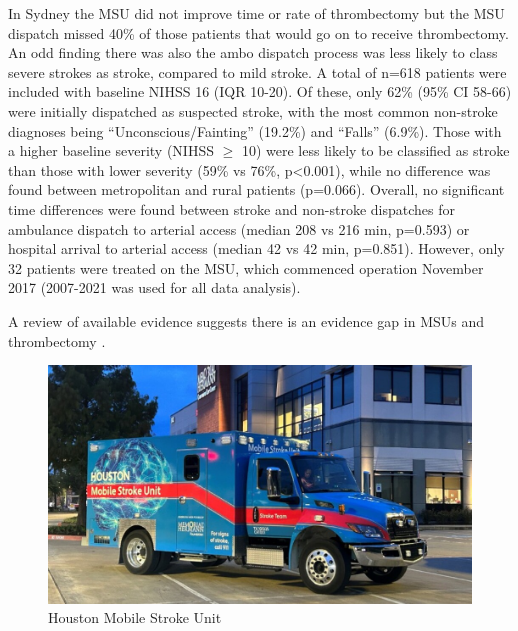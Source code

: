 In Sydney the MSU did not improve time or rate of thrombectomy \cite{haliem_abstract_2023} but the MSU dispatch missed 40\% of those patients that would go on to receive thrombectomy. An odd finding there was also the ambo dispatch process was less likely to class severe strokes as stroke, compared to mild stroke. A total of n=618 patients were included with baseline NIHSS 16 (IQR 10-20). Of these, only 62\% (95\% CI 58-66) were initially dispatched as suspected stroke, with the most common non-stroke diagnoses being “Unconscious/Fainting” (19.2\%) and “Falls” (6.9\%). Those with a higher baseline severity (NIHSS $\ge$ 10) were less likely to be classified as stroke than those with lower severity (59\% vs 76\%, p<0.001), while no difference was found between metropolitan and rural patients (p=0.066). Overall, no significant time differences were found between stroke and non-stroke dispatches for ambulance dispatch to arterial access (median 208 vs 216 min, p=0.593) or hospital arrival to arterial access (median 42 vs 42 min, p=0.851). However, only 32 patients were treated on the MSU, which commenced operation November 2017 (2007-2021 was used for all data analysis). 


A review of available evidence suggests there is an evidence gap in MSUs and thrombectomy \cite{navi_mobile_2022}.





\begin{figure}
    \centering
    \includegraphics[width=0.5\linewidth]{images_background/houston_msu.jpeg}
    \caption{Houston Mobile Stroke Unit}
    \label{fig:houston_msu}
\end{figure}

